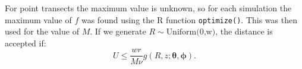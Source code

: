 \documentclass[useAMS,referee, usegraphicx]{biom}
\begin{document}
For point transects the maximum value is unknown, so for each simulation the maximum value of $f$ was found using the \textsf{R} function \texttt{optimize()}. This was then used for the value of $M$. If we generate $R \sim \text{Uniform(0,w)}$, the distance is accepted if:
\begin{equation*}
U \leq \frac{wr}{M\nu}g(R,z; \bm{\theta}, \bm{\phi}).
\end{equation*}

%



\label{lastpage}
\end{document}

